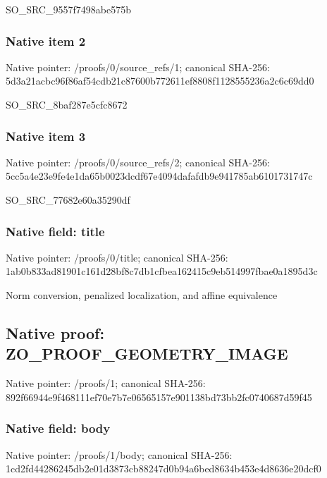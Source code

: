 \documentclass[10pt,a4paper]{article}
\begin{document}
SO\_SRC\_9557f7498abe575b


\subsubsection{Native item 2}


Native pointer: /proofs/0/source\_refs/1; canonical SHA-256: 5d3a21acbc96f86af54cdb21\allowbreak{}c87600b772611ef8808f1128\allowbreak{}555236a2c6c69dd0


SO\_SRC\_8baf287e5cfc8672


\subsubsection{Native item 3}


Native pointer: /proofs/0/source\_refs/2; canonical SHA-256: 5cc5a4e23e9fe4e1da65b002\allowbreak{}3dcdf67e4094dafafdb9e941\allowbreak{}785ab6101731747c


SO\_SRC\_77682e60a35290df


\subsubsection{Native field: title}


Native pointer: /proofs/0/title; canonical SHA-256: 1ab0b833ad81901c161d28bf\allowbreak{}8c7db1cfbea162415c9eb514\allowbreak{}997fbae0a1895d3c


Norm conversion, penalized localization, and affine equivalence


\subsection{Native proof: ZO\_PROOF\_GEOMETRY\_IMAGE}


Native pointer: /proofs/1; canonical SHA-256: 892f66944e9f468111ef70e7\allowbreak{}b7e06565157e901138bd73bb\allowbreak{}2fc0740687d59f45



\subsubsection{Native field: body}


Native pointer: /proofs/1/body; canonical SHA-256: 1cd2fd44286245db2e01d387\allowbreak{}3cb88247d0b94a6bed8634b4\allowbreak{}53e4d8636e20dcf0
\end{document}
